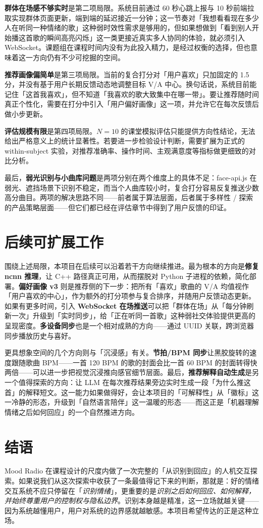 \textbf{群体在场感不够实时}是第二项局限。系统目前通过 60 秒心跳上报与 10 秒前端拉取实现群体页面更新，端到端的延迟接近一分钟；这一节奏对「我想看看现在多少人在听同一种情绪的歌」这种弱时效性需求是够用的，但如果想做到「看到别人开始播这首歌的瞬间高亮闪烁」这一类更接近真实多人协同的体验，就必须引入 WebSocket。课题组在课程时间内没有为此投入精力，是经过权衡的选择，但也意味着这一方向仍有不少可挖掘的空间。

\textbf{推荐画像偏简单}是第三项局限。当前的复合打分对「用户喜欢」只加固定的 1.5 分，并没有基于用户长期反馈动态地调整目标 V/A 中心。换句话说，系统目前能记住「这首我喜欢」，但不知道「我喜欢的歌大致集中在哪一带」。要让推荐随时间真正个性化，需要在打分中引入「用户偏好画像」这一项，并允许它在每次反馈后做小步更新。

\textbf{评估规模有限}是第四项局限。$N = 10$ 的课堂模拟评估只能提供方向性结论，无法给出严格意义上的统计显著性。若要进一步检验设计判断，需要扩展为正式的 within-subject 实验，对推荐准确率、操作时间、主观满意度等指标做更细致的对比分析。

最后，\textbf{弱光识别与小曲库问题}是两项分别在两个维度上的具体不足：face-api.js 在弱光、遮挡场景下识别不稳定，而当个人曲库较小时，复合打分容易反复推送少数高分曲目。两项的解决思路不同——前者属于算法层面，后者属于多样性 / 探索的产品策略层面——但它们都已经在评估章节中得到了用户反馈的印证。

\section{后续可扩展工作}

围绕上述局限，本项目在后续可以沿着若干方向继续推进。最为根本的方向是\textbf{修复 ncnn 推理}，让 C++ 路径真正可用，从而摆脱对 Python 子进程的依赖，简化部署。\textbf{偏好画像 v3} 则是推荐侧的下一步：把所有「喜欢」歌曲的 V/A 均值视作「用户喜欢的中心」，作为额外的打分项参与复合排序，并随用户反馈动态更新。如果有更多时间，引入 \textbf{WebSocket 在场推送}可以把「群体在场」从「每分钟刷新一次」升级到「实时同步」，给「正在听同一首歌」这种弱社交体验提供更高的呈现密度。\textbf{多设备同步}也是一个相对成熟的方向——通过 UUID 关联，跨浏览器同步播放历史与喜好。

更具想象空间的几个方向则与「沉浸感」有关。\textbf{节拍/BPM 同步}让黑胶旋转的速度跟随歌曲 BPM——一首 120 BPM 的歌的封面会比一首 60 BPM 的封面转得快两倍——可以进一步把视觉沉浸推向感官细节层面。最后，\textbf{推荐解释自动生成}是另一个值得探索的方向：让 LLM 在每次推荐结果旁边实时生成一段「为什么推这首」的解释短文。这一能力如果做得好，会让本项目的「可解释性」从「徽标」这一冷静的形态，升级到「自然语言陪伴」这一温暖的形态——而这正是「机器理解情绪之后如何回应」的一个自然推进方向。

\section{结语}

Mood Radio 在课程设计的尺度内做了一次完整的「从识别到回应」的人机交互探索。如果说我们从这次探索中收获了一条最值得记下来的判断，那就是：好的情绪交互系统不应只停留在「\emph{识别情绪}」，更重要的是\emph{识别之后如何回应、如何解释，并始终尊重用户的控制权与隐私边界}。识别本身越是精准，这一立场就越关键——因为系统越懂用户，用户对系统的边界感就越敏感。本项目希望传达的正是这种立场。
